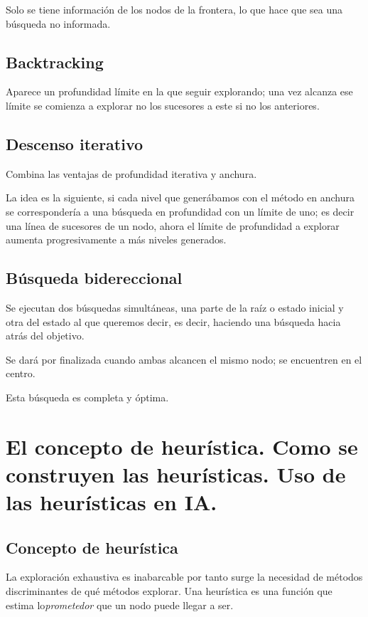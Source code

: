 \documentclass[12 pt, a4paper]{article}
\begin{document}
 Solo se tiene información de los nodos de la frontera, lo que hace que sea una búsqueda no informada.
 
 

\subsection{Backtracking}
Aparece un profundidad límite en la que seguir explorando; una vez alcanza ese límite se comienza a explorar no los sucesores
a este si no los anteriores. 

\subsection{ Descenso iterativo}  
Combina las ventajas de profundidad iterativa y anchura. 

La idea es la siguiente, si cada nivel que generábamos con el método en anchura se 
correspondería a una búsqueda en profundidad con un límite de uno; es decir una línea de sucesores de un nodo,
 ahora el límite de profundidad a explorar aumenta progresivamente a más niveles generados. 

\subsection{Búsqueda bidereccional}  
Se ejecutan dos búsquedas simultáneas, una parte de la raíz o estado inicial y otra 
del estado al que queremos decir, es decir, haciendo una búsqueda hacia atrás del objetivo. 

Se dará por finalizada cuando ambas alcancen el mismo nodo; se encuentren en el centro.

Esta búsqueda es completa y óptima. 








\newpage

\section{El concepto de heurística. Como se construyen las heurísticas. Uso de las heurísticas en IA.}

\subsection{Concepto de heurística}  

La exploración exhaustiva es inabarcable por tanto surge la necesidad de métodos discriminantes
de qué métodos explorar. Una heurística es una función que estima lo\textit{prometedor} que un nodo puede llegar a ser. 
\end{document}
